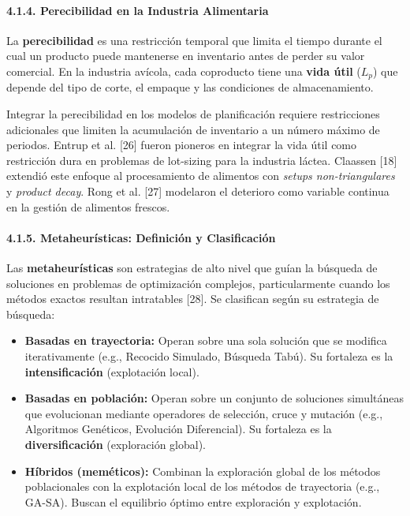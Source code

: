 \documentclass[
  spanish,
  12pt,
]{article}
\providecommand{\tightlist}{%
  \setlength{\itemsep}{0pt}\setlength{\parskip}{0pt}}
\begin{document}
\paragraph{4.1.4. Perecibilidad en la Industria
Alimentaria}\label{perecibilidad-en-la-industria-alimentaria}

La \textbf{perecibilidad} es una restricción temporal que limita el
tiempo durante el cual un producto puede mantenerse en inventario antes
de perder su valor comercial. En la industria avícola, cada coproducto
tiene una \textbf{vida útil} (\(L_p\)) que depende del tipo de corte, el
empaque y las condiciones de almacenamiento.

Integrar la perecibilidad en los modelos de planificación requiere
restricciones adicionales que limiten la acumulación de inventario a un
número máximo de periodos. Entrup et al. {[}26{]} fueron pioneros en
integrar la vida útil como restricción dura en problemas de lot-sizing
para la industria láctea. Claassen {[}18{]} extendió este enfoque al
procesamiento de alimentos con \emph{setups non-triangulares} y
\emph{product decay}. Rong et al. {[}27{]} modelaron el deterioro como
variable continua en la gestión de alimentos frescos.

\paragraph{4.1.5. Metaheurísticas: Definición y
Clasificación}\label{metaheuruxedsticas-definiciuxf3n-y-clasificaciuxf3n}

Las \textbf{metaheurísticas} son estrategias de alto nivel que guían la
búsqueda de soluciones en problemas de optimización complejos,
particularmente cuando los métodos exactos resultan intratables
{[}28{]}. Se clasifican según su estrategia de búsqueda:

\begin{itemize}
\tightlist
\item
  \textbf{Basadas en trayectoria:} Operan sobre una sola solución que se
  modifica iterativamente (e.g., Recocido Simulado, Búsqueda Tabú). Su
  fortaleza es la \textbf{intensificación} (explotación local).
\item
  \textbf{Basadas en población:} Operan sobre un conjunto de soluciones
  simultáneas que evolucionan mediante operadores de selección, cruce y
  mutación (e.g., Algoritmos Genéticos, Evolución Diferencial). Su
  fortaleza es la \textbf{diversificación} (exploración global).
\item
  \textbf{Híbridos (meméticos):} Combinan la exploración global de los
  métodos poblacionales con la explotación local de los métodos de
  trayectoria (e.g., GA-SA). Buscan el equilibrio óptimo entre
  exploración y explotación.
\end{itemize}
\end{document}
